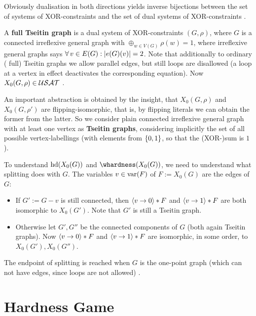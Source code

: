\documentclass[12pt]{book}
\begin{document}
Obviously dualisation in both directions yields inverse bijections between the set of systems of XOR-constraints and the set of dual systems of XOR-constraints \cite{h5}.

\begin{defi}\label{def:tgraph}
A \textbf{full Tseitin graph} is a dual system of XOR-constraints $(G,\rho)$, where $G$ is a connected irreflexive general graph with 
$\oplus_{w \in V(G)} \rho(w) = 1$, where irreflexive general graphs says $\forall\, v \in E(G) : \lvert e(G)(v) \rvert = 2$. Note that additionally to ordinary (
full) Tseitin graphs we allow parallel edges, but still loops are disallowed (a loop at a vertex in effect deactivates the corresponding equation). 
Now $X_0(G,\rho) \in \mathcal{USAT}$ \cite{h5}.
\end{defi}

An important abstraction is obtained by the insight, that $X_0(G,\rho)$ and $X_0(G,\rho')$ are flipping-isomorphic, that is, by flipping literals we 
can obtain the former from the latter. So we consider plain connected irreflexive general graph with at least one vertex as \textbf{Tseitin graphs}, 
considering implicitly the set of all possible vertex-labellings (with elements from $\{ 0,1 \}$, so that the (XOR-)sum is $1$).

To understand $\operatorname{hd}(X_0(G))$ and $\whardness(X_0(G))$, we need to understand what splitting does with $G$. The variables $v \in \operatorname{var}(F)$ of 
$F := X_0(G)$ are the edges of $G$:
\begin{itemize}
\item If $G' := G - v$ is still connected, then $\langle v \rightarrow 0 \rangle * F$ and $\langle v \rightarrow 1 \rangle * F$ are both isomorphic to $X_0(G')$. Note that $G'$ is still a Tseitin graph.
\item Otherwise let $G', G''$ be the connected components of $G$ (both again Tseitin graphs). Now $\langle v \rightarrow 0 \rangle * F$ and $\langle v \rightarrow 1 \rangle * F$ are isomorphic, in some 
order, to $X_0(G'), X_0(G'')$.
\end{itemize}
The endpoint of splitting is reached when $G$ is the one-point graph (which can not have edges, since loops are not allowed) \cite{h5}. 

\section{Hardness Game}
\label{sec:Hardness Game}	  
\end{document}
